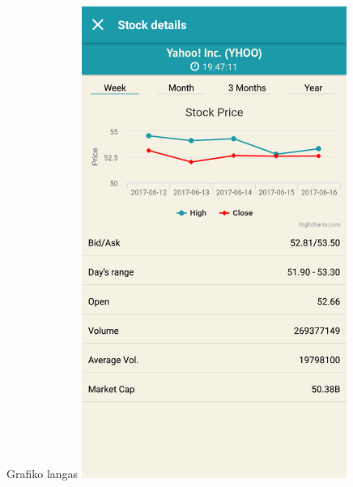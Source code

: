 \documentclass[hyperref={breaklinks=true},fleqn,mathserif]{beamer}
\begin{document}
\begin{frame}
\begin{columns}
\begin{column}{.48\textwidth}
\begin{block}{Grafiko langas}
					\includegraphics[width=0.65\textwidth]{Pav/stockDetails.png}\centering
				\end{block}
			\end{column}
		\end{columns}
	\end{frame}
\end{document}
